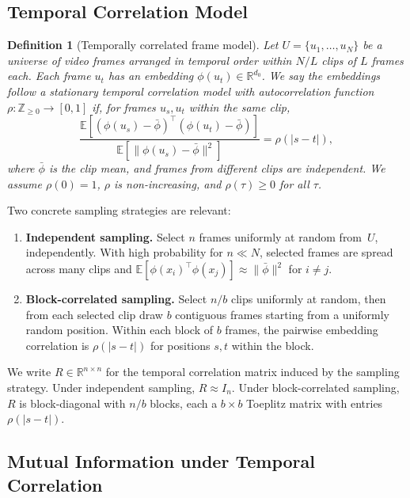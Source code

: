 \documentclass[letterpaper]{article} %
\newtheorem{definition}[theorem]{Definition}
\begin{document}
\subsection{Temporal Correlation Model}

\begin{definition}[Temporally correlated frame model]
\label{def:temporal_correlation}
Let $U = \{u_1, \ldots, u_N\}$ be a universe of video frames
arranged in temporal order within $N/L$ clips of $L$ frames
each. Each frame $u_t$ has an embedding
$\phi(u_t) \in \mathbb{R}^{d_0}$. We say the embeddings
follow a \emph{stationary temporal correlation model} with
autocorrelation function $\rho : \mathbb{Z}_{\ge 0} \to [0,1]$
if, for frames $u_s, u_t$ within the same clip,
\[
\frac{
  \mathbb{E}[(\phi(u_s) - \bar\phi)^\top(\phi(u_t) - \bar\phi)]
}{
  \mathbb{E}[\|\phi(u_s) - \bar\phi\|^2]
}
= \rho(|s - t|),
\]
where $\bar\phi$ is the clip mean, and frames from different
clips are independent. We assume $\rho(0) = 1$, $\rho$ is
non-increasing, and $\rho(\tau) \ge 0$ for all $\tau$.
\end{definition}

Two concrete sampling strategies are relevant:

\begin{enumerate}[leftmargin=*]
\item \textbf{Independent sampling.} Select $n$ frames
  uniformly at random from~$U$, independently.  With high
  probability for $n \ll N$, selected frames are spread across
  many clips and
  $\mathbb{E}[\phi(x_i)^\top\phi(x_j)] \approx \|\bar\phi\|^2$
  for $i \neq j$.
\item \textbf{Block-correlated sampling.}  Select $n/b$ clips
  uniformly at random, then from each selected clip draw $b$
  contiguous frames starting from a uniformly random position.
  Within each block of $b$ frames, the pairwise embedding
  correlation is $\rho(|s-t|)$ for positions $s, t$ within the
  block.
\end{enumerate}

We write $R \in \mathbb{R}^{n \times n}$ for the temporal
correlation matrix induced by the sampling strategy.  Under
independent sampling, $R \approx I_n$.  Under block-correlated
sampling, $R$ is block-diagonal with $n/b$ blocks, each a
$b \times b$ Toeplitz matrix with entries $\rho(|s-t|)$.

\subsection{Mutual Information under Temporal Correlation}
\end{document}
